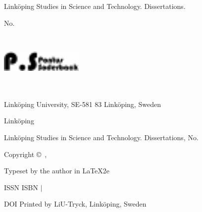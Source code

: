 \thispagestyle{empty}
\begin{center}
{\large Linköping Studies in Science and Technology. Dissertations.

No. \Number}
\vspace{1cm}


{\LARGE{\textbf{\MainTitleThesis}}} \\[5mm]
\large{\SecondaryTitleThesis}
\vspace{0.8cm}

{\large{\textbf{\Author}}}
\vfill


\includegraphics[width=40mm]{../Logos/blackLogo.pdf}
\vspace{0.5cm}

\phdStudentDepartmentEnglish \\ 
\phdStudentDivisionEnglish \\
Linköping University, SE-581 83 Linköping, Sweden

Linköping \aar

\end{center}

\newpage
\thispagestyle{empty}
\vspace*{\fill}

{Linköping Studies in Science and Technology. Dissertations, No. \Number}

\textbf{\MainTitleThesis}

Copyright \copyright\ \Author, \aar\

Typeset by the author in \LaTeX2e

ISSN \issn \newline
ISBN \isbnPrint{ }$\vert${ }\isbnPdf \rule{0cm}{0.44cm} \newline
DOI  \doi \newline
Printed by LiU-Tryck, Linköping, Sweden \aar \rule{0cm}{0.44cm} 

